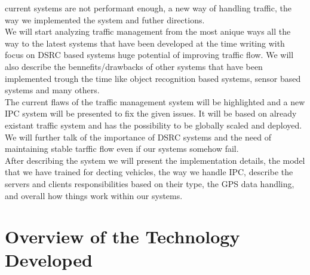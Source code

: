 \documentclass[17pt]{report}
\begin{document}
current systems are not performant enough, a new way of handling 
traffic, the way we implemented the system and futher directions. \\
\indent \indent
We will start analyzing traffic management from the most anique ways all the
way to the latest systems that have been developed at the time writing with
focus on DSRC based systems huge potential of improving traffic flow. 
We will also describe the bennefits/drawbacks of other systems that have 
been implemented trough the time like object recognition based systems, 
sensor based systems and many others.\\
\indent \indent 
The current flaws of the traffic management system will be highlighted and 
a new IPC system will be presented to fix the given issues. It will be based on 
already existant traffic system and has the possibility to be globally scaled
and deployed. We will further talk of the importance of DSRC systems and the
need of maintaining stable tarffic flow even if our systems somehow fail. \\
\indent \indent 
After describing the system we will present the implementation details, the 
model that we have trained for decting vehicles, the way we handle IPC, describe 
the servers and clients responsibilities based on their type, the GPS data 
handling, and overall how things work within our systems.


\chapter{Overview of the Technology Developed}
\end{document}
